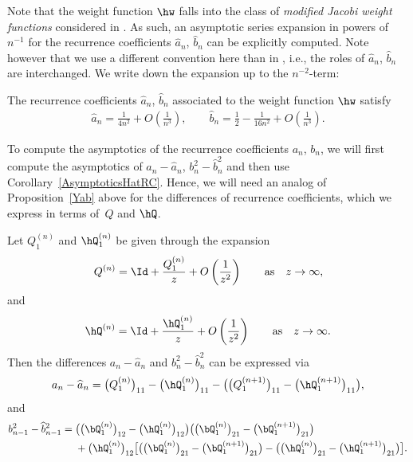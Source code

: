 Note that the weight function $\hw$ falls into the class of \emph{modified Jacobi weight functions} considered in \cite{KMVV}. As such, an asymptotic series expansion in powers of $n^{-1}$ for the recurrence coefficients $\widehat a_n$, $\widehat b_n$ can be explicitly computed. Note however that we use a different convention here than in \cite{KMVV}, i.e., the roles of $\widehat a_n$, $\widehat b_n$ are interchanged. We write down the expansion up to the $n^{-2}$-term:
\begin{Corollary}\label{AsymptoticsHatRC}
The recurrence coefficients $\widehat a_n$, $\widehat b_n$ associated to the weight function $\hw$ satisfy
\begin{align*}
 \widehat a_n= \frac{1}{4n^2} + O\left(\frac{1}{n^3}\right),\qquad \widehat b_n = \frac{1}{2}-\frac{1}{16n^2} + O\left(\frac{1}{n^3}\right).
\end{align*}
\end{Corollary}
To compute the asymptotics of the recurrence coefficients $a_n$, $b_n$, we will first compute the asymptotics of $a_n -\widehat a_n$, $b_n^2-\widehat b_n^2$ and then use Corollary~\ref{AsymptoticsHatRC}. Hence, we will need an analog of Proposition~\ref{Yab} above for the differences of recurrence coefficients, which we express in terms of~$Q$ and $\hQ$.
\begin{Proposition}[{\cite[Proposition~3.6]{CD}}]\label{PropRecQ}
 Let $Q_1^{(n)}$ and $\hQ_1^{(n)}$ be given through the expansion
 \begin{align*}
 Q^{(n)} = \Id + \frac{Q_1^{(n)}}{z} + O\left(\frac{1}{z^2}\right) \qquad \text{as} \quad z\to\infty,
 \end{align*}
 and
 \begin{align*}
 \hQ^{(n)} = \Id + \frac{\hQ_1^{(n)}}{z} + O\left(\frac{1}{z^2}\right) \qquad \text{as} \quad z\to\infty.
 \end{align*}
Then the differences $a_n - \widehat a_n$ and $b_n^2 -\widehat b_n^2$ can be expressed via
\begin{align}\label{a_n-widehat a_n}
 a_n - \widehat a_n = \big(Q_1^{(n)}\big)_{11}-\big(\hQ_1^{(n)}\big)_{11} - \big(\big(Q_1^{(n+1)}\big)_{11}-\big(\hQ_1^{(n+1)}\big)_{11}\big),
\end{align}
and
\begin{align}\nonumber
 b_{n-1}^2-\widehat b_{n-1}^2 ={}& \big(\big(\bQ_1^{(n)}\big)_{12}-\big(\hQ_1^{(n)}\big)_{12}\big)\big(\big(\bQ_1^{(n)}\big)_{21}-\big(\bQ_1^{(n+1)}\big)_{21}\big)
 \\\label{b_n^2-widehat b_n^2}
 &+ \big( \hQ_1^{(n)}\big)_{12}\big[\big(\big(\bQ_1^{(n)}\big)_{21}-\big(\bQ_1^{(n+1)}\big)_{21}\big)-\big(\big(\hQ_1^{(n)}\big)_{21}-\big(\hQ_1^{(n+1)}\big)_{21}\big)\big].
\end{align}
\end{Proposition}
